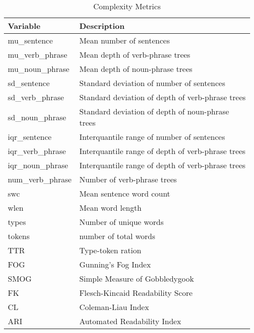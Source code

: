 \documentclass[../thesis.tex]{subfiles}
\begin{document}
\begin{longtable}[t]{ll}
\caption{\label{tab:}Complexity Metrics}\\
\toprule
Variable & Description\\
\midrule
mu\_sentence & Mean number of sentences\\
mu\_verb\_phrase & Mean depth of verb-phrase trees\\
mu\_noun\_phrase & Mean depth of noun-phrase trees\\
sd\_sentence & Standard deviation of number of sentences\\
sd\_verb\_phrase & Standard deviation of depth of verb-phrase trees\\
\addlinespace
sd\_noun\_phrase & Standard deviation of depth of noun-phrase trees\\
iqr\_sentence & Interquantile range of number of sentences\\
iqr\_verb\_phrase & Interquantile range of depth of verb-phrase trees\\
iqr\_noun\_phrase & Interquantile range of depth of verb-phrase trees\\
num\_verb\_phrase & Number of verb-phrase trees\\
\addlinespace
swc & Mean sentence word count\\
wlen & Mean word length\\
types & Number of unique words\\
tokens & number of total words\\
TTR & Type-token ration\\
\addlinespace
FOG & Gunning's Fog Index\\
SMOG & Simple Measure of Gobbledygook\\
FK & Flesch-Kincaid Readability Score\\
CL & Coleman-Liau Index\\
ARI & Automated Readability Index\\
\bottomrule
\end{longtable}
\end{document}

